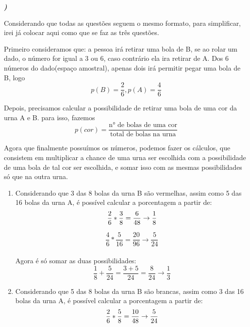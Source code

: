 \documentclass[12pt]{article}
\newcounter{instn}
\newcommand{\instnum}{\arabic{instn}}
\newcommand{\myline}[1]{
    \emph{\textbf{#1)}}
    \addtocounter{instn}{1}
}
\newenvironment{question}
 {
    \myline{\instnum} 
    }
    {
 }
\begin{document}

    \begin{question}

        Considerando que todas as questões seguem o mesmo formato, para simplificar, irei já colocar aqui
        como que se faz as três questões. 

        Primeiro consideramos que: a pessoa irá retirar uma bola de B, se ao rolar um dado, o número for igual a 3 ou 6, 
        caso contrário ela ira retirar de A. Dos 6 números do dado(espaço amostral), apenas dois irá permitir pegar uma bola de 
        B, logo \[p(B) = \frac{2}{6}, p(A) = \frac{4}{6}\]

        Depois, precisamos calcular a possibilidade de retirar uma bola de uma cor da urna A e B.
        para isso, fazemos \[p(cor) = \frac{\text{n° de bolas de uma cor}}{\text{total de bolas na urna}}\]

        Agora que finalmente possuímos os números, podemos fazer os cálculos, que consistem em multiplicar a chance de uma urna 
        ser escolhida com a possibilidade de uma bola de tal cor ser escolhida, e somar isso com as mesmas possibilidades só que na 
        outra urna. 

        \begin{enumerate}[label={\textbf{\alph*)}}]
            \item Considerando que 3 das 8 bolas da urna B são vermelhas, assim como 5 das 16 bolas da urna A, 
            é possível calcular a porcentagem a partir de: \\
            \[
                \frac{2}{6} * \frac{3}{8} = \frac{6}{48} \rightarrow \frac{1}{8} \\ 
            \]

            \[
                \frac{4}{6} * \frac{5}{16} = \frac{20}{96} \rightarrow \frac{5}{24}    
            \]
            \\
            Agora é só somar as duas possibilidades: 
            \begin{equation}
                \frac{1}{8} + \frac{5}{24} = \frac{3+5}{24} = \frac{8}{24} \rightarrow \frac{1}{3} 
            \end{equation}

            \item Considerando que 5 das 8 bolas da urna B são brancas, assim como 3 das 16 bolas da urna A, 
            é possível calcular a porcentagem a partir de: \\
            \[
                \frac{2}{6} * \frac{5}{8} = \frac{10}{48} \rightarrow \frac{5}{24} \\ 
            \]


\end{enumerate}
\end{question}
\end{document}
